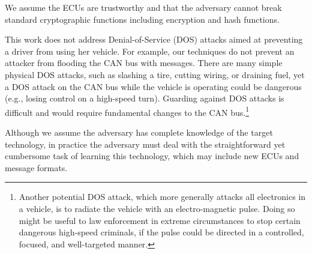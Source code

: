 We assume the ECUs are trustworthy and that the adversary cannot break standard cryptographic functions 
including encryption and hash functions.

This work does not address Denial-of-Service (DOS) attacks aimed at preventing a driver from using her vehicle.  
For example, our techniques do not prevent an attacker from flooding the CAN bus with messages.  There are many
simple physical DOS attacks, such as slashing a tire, cutting wiring, or draining fuel, yet
a DOS attack on the CAN bus while the vehicle is operating could be dangerous 
(e.g., losing control on a high-speed turn).  Guarding against DOS attacks is difficult and would require fundamental
changes to the CAN bus.\footnote{Another potential DOS attack, which more generally attacks
all electronics in a vehicle, is to radiate the vehicle with an electro-magnetic pulse.
Doing so might be useful to law enforcement in extreme circumstances to stop certain dangerous high-speed criminals, 
if the pulse could be directed in a controlled, focused, and well-targeted manner.}

Although we assume the adversary has complete knowledge of the target technology, in practice the adversary must
deal with the straightforward yet cumbersome task of learning this technology, which may include new ECUs and message formats.



